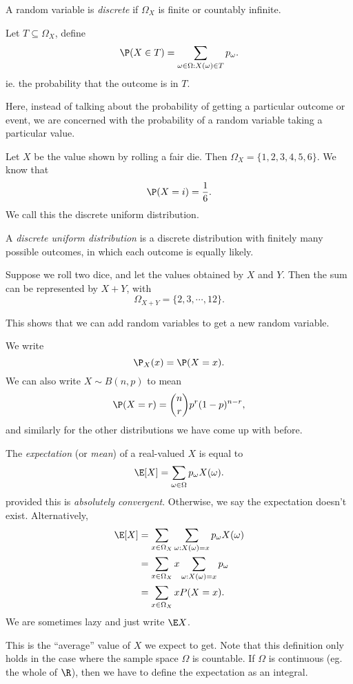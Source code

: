 \documentclass[a4paper]{article}
\begin{document}
\begin{defi}
  A random variable is \emph{discrete} if $\Omega_X$ is finite or countably infinite.
\end{defi}

\begin{notation}
  Let $T\subseteq \Omega_X$, define
  \[
    \P(X\in T) = \sum_{\omega \in \Omega: X(\omega)\in T}p_\omega.
  \]
  ie. the probability that the outcome is in $T$.
\end{notation}
Here, instead of talking about the probability of getting a particular outcome or event, we are concerned with the probability of a random variable taking a particular value.

\begin{eg}
  Let $X$ be the value shown by rolling a fair die. Then $\Omega_X = \{1, 2, 3, 4, 5, 6\}$. We know that
  \[
    \P(X = i) = \frac{1}{6}.
  \]
  We call this the discrete uniform distribution.
\end{eg}
\begin{defi}
  A \emph{discrete uniform distribution} is a discrete distribution with finitely many possible outcomes, in which each outcome is equally likely.
\end{defi}

\begin{eg}
  Suppose we roll two dice, and let the values obtained by $X$ and $Y$. Then the sum can be represented by $X + Y$, with
  \[
    \Omega_{X + Y} = \{2, 3, \cdots, 12\}.
  \]
\end{eg}
This shows that we can add random variables to get a new random variable.

\begin{notation}
  We write
  \[
    \P_X(x) = \P(X = x).
  \]
  We can also write $X\sim B(n, p)$ to mean
  \[
    \P(X = r) = \binom{n}{r}p^r(1 - p)^{n - r},
  \]
  and similarly for the other distributions we have come up with before.
\end{notation}

\begin{defi}[Expectation]
  The \emph{expectation} (or \emph{mean}) of a real-valued $X$ is equal to
  \[
    \E[X] = \sum_{\omega\in \Omega}p_\omega X(\omega).
  \]
  provided this is \emph{absolutely convergent}. Otherwise, we say the expectation doesn't exist. Alternatively,
  \begin{align*}
    \E[X] &= \sum_{x\in \Omega_X}\sum_{\omega: X(\omega) = x}p_\omega X(\omega)\\
    &= \sum_{x\in \Omega_X}x\sum_{\omega:X(\omega) = x}p_\omega\\
    &= \sum_{x\in \Omega_X}xP(X = x).
  \end{align*}
  We are sometimes lazy and just write $\E X$.
\end{defi}
This is the ``average'' value of $X$ we expect to get. Note that this definition only holds in the case where the sample space $\Omega$ is countable. If $\Omega$ is continuous (eg. the whole of $\R$), then we have to define the expectation as an integral.
\end{document}
